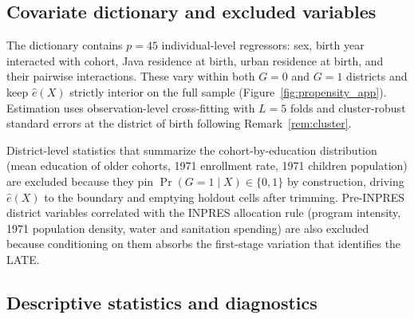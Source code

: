 \subsection{Covariate dictionary and excluded variables}\label{sec:6c}

The dictionary contains $p = 45$ individual-level regressors: sex, birth year interacted with cohort, Java residence at birth, urban residence at birth, and their pairwise interactions. These vary within both $G = 0$ and $G = 1$ districts and keep $\hat e(X)$ strictly interior on the full sample (Figure~\ref{fig:propensity_app}). Estimation uses observation-level cross-fitting with $L = 5$ folds and cluster-robust standard errors at the district of birth following Remark~\ref{rem:cluster}.

District-level statistics that summarize the cohort-by-education distribution (mean education of older cohorts, 1971 enrollment rate, 1971 children population) are excluded because they pin $\Pr(G = 1 \mid X) \in \{0, 1\}$ by construction, driving $\hat e(X)$ to the boundary and emptying holdout cells after trimming. Pre-INPRES district variables correlated with the INPRES allocation rule (program intensity, 1971 population density, water and sanitation spending) are also excluded because conditioning on them absorbs the first-stage variation that identifies the LATE.

\subsection{Descriptive statistics and diagnostics}\label{sec:app_descriptives}

\begin{table}[H]
    \centering
    
    \caption[Descriptive statistics by group-time cell]{Descriptive statistics by group-time cell. $G=1$ districts experienced a significant cohort shift in the education distribution with rising schooling; $G=0$ districts did not. $T=0$ is the old cohort (1957--1962, unexposed to INPRES), $T=1$ the young cohort (1968--1972, exposed). $Y$ is log hourly wage; $D = \mathbf{1}\{\text{years of schooling} \geq 6\}$. District-level covariates are from 1971 census data. Standard deviations in parentheses.}\label{tab:balance}
\end{table}

